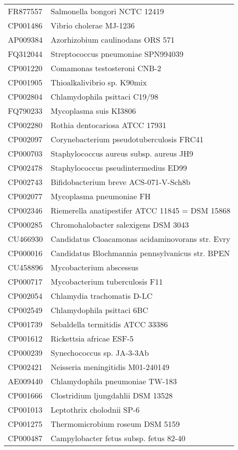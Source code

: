 \begin{longtable}{ll}
FR877557 & Salmonella bongori NCTC 12419\\
CP001486 & Vibrio cholerae MJ-1236\\
AP009384 & Azorhizobium caulinodans ORS 571\\
FQ312044 & Streptococcus pneumoniae SPN994039\\
CP001220 & Comamonas testosteroni CNB-2\\
CP001905 & Thioalkalivibrio sp. K90mix\\
CP002804 & Chlamydophila psittaci C19/98\\
FQ790233 & Mycoplasma suis KI3806\\
CP002280 & Rothia dentocariosa ATCC 17931\\
CP002097 & Corynebacterium pseudotuberculosis FRC41\\
CP000703 & Staphylococcus aureus subsp. aureus JH9\\
CP002478 & Staphylococcus pseudintermedius ED99\\
CP002743 & Bifidobacterium breve ACS-071-V-Sch8b\\
CP002077 & Mycoplasma pneumoniae FH\\
CP002346 & Riemerella anatipestifer ATCC 11845 = DSM 15868\\
CP000285 & Chromohalobacter salexigens DSM 3043\\
CU466930 & Candidatus Cloacamonas acidaminovorans str. Evry\\
CP000016 & Candidatus Blochmannia pennsylvanicus str. BPEN\\
CU458896 & Mycobacterium abscessus\\
CP000717 & Mycobacterium tuberculosis F11\\
CP002054 & Chlamydia trachomatis D-LC\\
CP002549 & Chlamydophila psittaci 6BC\\
CP001739 & Sebaldella termitidis ATCC 33386\\
CP001612 & Rickettsia africae ESF-5\\
CP000239 & Synechococcus sp. JA-3-3Ab\\
CP002421 & Neisseria meningitidis M01-240149\\
AE009440 & Chlamydophila pneumoniae TW-183\\
CP001666 & Clostridium ljungdahlii DSM 13528\\
CP001013 & Leptothrix cholodnii SP-6\\
CP001275 & Thermomicrobium roseum DSM 5159\\
CP000487 & Campylobacter fetus subsp. fetus 82-40\\

\end{longtable}
